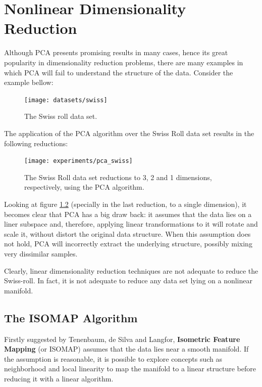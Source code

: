 \chapter{Nonlinear Dimensionality Reduction}

Although PCA presents promising results in many cases, hence its great popularity in dimensionality reduction problems, there are many examples in which PCA will fail to understand the structure of the data. Consider the example bellow:

\begin{figure}[H]
	\centering
	\captionsetup{justification=centering}
	
	\texttt{[image: datasets/swiss]}
	\caption{The Swiss roll data set.}
	\label{fig:dsswiss}
\end{figure}

The application of the PCA algorithm over the Swiss Roll data set results in the following reductions:

\begin{figure}[H]
	\centering
	\captionsetup{justification=centering}

	\texttt{[image: experiments/pca\_swiss]}
	\caption{The Swiss Roll data set reductions to 3, 2 and 1 dimensions, respectively, using the PCA algorithm.}
	\label{fig:swiss_pca}
\end{figure}

Looking at figure \ref{fig:swiss_pca} (specially in the last reduction, to a single dimension), it becomes clear that PCA has a big draw back: it assumes that the data lies on a liner subspace \cite{cay2005} and, therefore, applying linear transformations to it will rotate and scale it, without distort the original data structure. When this assumption does not hold, PCA will incorrectly extract the underlying structure, possibly mixing very dissimilar samples.

Clearly, linear dimensionality reduction techniques are not adequate to reduce the Swiss-roll. In fact, it is not adequate to reduce any data set lying on a nonlinear manifold.

\section{The ISOMAP Algorithm}

Firstly suggested by Tenenbaum, de Silva and Langfor, \textbf{Isometric Feature Mapping} (or ISOMAP) assumes that the data lies near a smooth manifold. If the assumption is reasonable, it is possible to explore concepts such as neighborhood and local linearity to map the manifold to a linear structure before reducing it with a linear algorithm.

